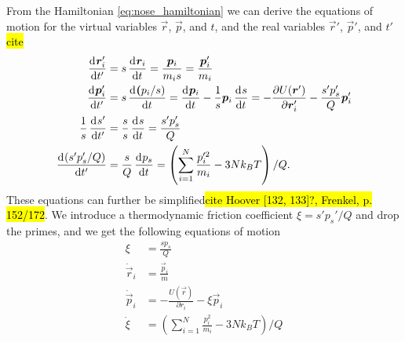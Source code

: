 From the Hamiltonian \cref{eq:nose_hamiltonian} we can derive the equations of motion for the virtual variables $\vec r$, $\vec p$, and $t$, and the real variables $\vec r'$, $\vec p'$, and $t'$ \hl{cite}
\begin{align*}
    \dod{\vec r_i'}{t'}     &= s\dod{\vec r_i}{t} = \frac{\vec p_i}{m_is} = \frac{\vec p_i'}{m_i} \\
    \dod{\vec p_i'}{t'}     &= s\dod{\vec (p_i/s)}{t} = \dod{\vec p_i}{t} - \frac{1}{s}\vec p_i\dod{s}{t} = -\frac{\partial U(\vec r')}{\partial \vec r_i'} - \frac{s'p_s'}{Q}\vec p_i' \\
    \frac{1}{s}\dod{s'}{t'} &= \frac{s}{s}\dod{s}{t} = \frac{s'p_s'}{Q} \\
    \dod{(s'p_s'/Q)}{t'}    &= \frac{s}{Q}\dod{p_s}{t} = \left( \sum_{i=1}^N \frac{p_i'^2}{m_i} - 3Nk_BT\right) / Q.
\end{align*}
These equations can further be simplified\hl{cite Hoover [132, 133]?, Frenkel, p. 152/172}. We introduce a thermodynamic friction coefficient $\xi = s'p_s'/Q$ and drop the primes, and we get the following equations of motion
\begin{align}
    \xi             &= \frac{sp_s}{Q} \label{eq:nose_xi}\\
    \dot{\vec r}_i  &= \frac{\vec p_i}{m} \label{eq:nose_position}\\
    \dot{\vec p}_i  &= -\frac{U(\vec r)}{\partial r_i} - \xi \vec p_i \label{eq:nose_momentum}\\
    \dot\xi         &= \left( \sum_{i=1}^N \frac{p_i^2}{m_i} - 3Nk_BT \right) / Q \label{eq:nose_dotxi}%
\end{align}

